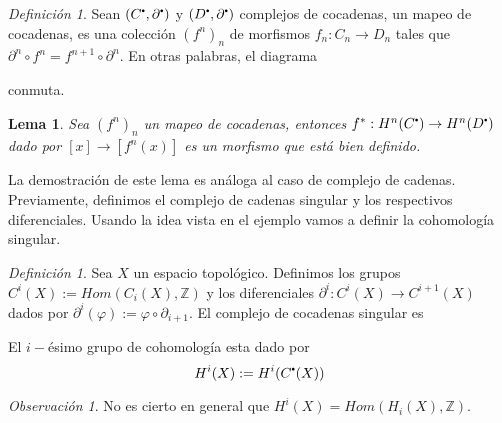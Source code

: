 \documentclass[aop]{imsart2}
\theoremstyle{plain}
\newtheorem{lema}[teo]{Lema}
\theoremstyle{remark}
\newtheorem{dfn}[teo]{Definición}
\newtheorem*{obs}{Observación}
\newcommand\sbullet[1][.5]{\mathbin{\vcenter{\hbox{\scalebox{#1}{$\bullet$}}}}}
\def \Z {\mathbb{Z}}
\begin{document}
\vspace{2mm}
\begin{dfn}
    Sean $(C^{\sbullet},\partial^{\sbullet})$ y $(D^{\sbullet},\partial^{\sbullet})$ complejos de
    cocadenas, un mapeo de cocadenas, es una colección $(f^{n})_{n}$ de morfismos
    $f_{n}:C_{n}\to D_{n}$ tales que $\partial^{n}\circ f^{n}=f^{n+1}\circ\partial^{n}$. En otras
    palabras, el diagrama

    \vspace{2mm}
    \centerline{
    }
    \noindent conmuta.
\end{dfn}

\begin{lema}
    Sea $(f^{n})_{n}$ un mapeo de cocadenas, entonces $f^{*}:H^{n}(C^{\sbullet})\to 
    H^{n}(D^{\sbullet})$ dado por $[x]\to[f^{n}(x)]$ es un morfismo que está bien definido.
\end{lema}

\noindent La demostración de este lema es análoga al caso de complejo de cadenas. Previamente,
definimos el complejo de cadenas singular y los respectivos diferenciales. Usando la idea vista en
el ejemplo vamos a definir la cohomología singular.

\begin{dfn}
    Sea $X$ un espacio topológico. Definimos los grupos $C^{i}(X):=Hom(C_{i}(X),\Z)$ y los 
    diferenciales $\partial^{i}:C^{i}(X)\to C^{i+1}(X)$ dados por $\partial^{i}(\varphi)
    :=\varphi\circ\partial_{i+1}$. El complejo de cocadenas singular es
    
    \vspace{2mm}
    \centerline{
    }
    \vspace{2mm}
    \noindent El $i-$ésimo grupo de cohomología esta dado por
    \begin{equation*}
        H^{i}(X):=H^{i}(C^{\sbullet}(X))
    \end{equation*}
\end{dfn}

\begin{obs}
    No es cierto en general que $H^{i}(X)=Hom(H_{i}(X),\Z)$.
\end{obs}
\end{document}
